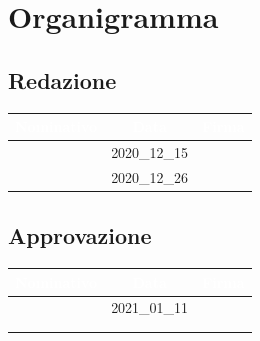 \section{Organigramma}
\label{organigramma}

\subsection{Redazione}
\begin{table}[H]
	\begin{center}
		\begin{tabular}{|c c c|}
			\rowcolor{darkblue}
			\textcolor{white}{Nominativo} 	& \textcolor{white}{Data} 	& \textcolor{white}{Firma} \\ \hline
							\MM 			&		2020\_12\_15		& \\ \hline
							\PC				&		2020\_12\_26		& \\ \hline
		\end{tabular}
	\end{center}
\end{table}

\subsection{Approvazione}
\begin{table}[H]
	\begin{center}
		\begin{tabular}{|c c c|}
			\rowcolor{darkblue}
			\textcolor{white}{Nominativo} 	& \textcolor{white}{Data} 	& \textcolor{white}{Firma} \\ \hline
							\TL	& 2021\_01\_11 &   \\ \hline
							\VT 			&							& \\ \hline
							\CR				&							& \\ \hline
		\end{tabular}
	\end{center}
\end{table}

